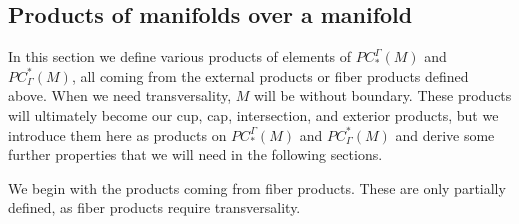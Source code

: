 \subsection{Products of manifolds over a manifold}\label{S: prechain products}

In this section we define various products of elements of $PC_*^\Gamma(M)$ and $PC^*_\Gamma(M)$, all coming from the external products or fiber products defined above.
When we need transversality, $M$ will be without boundary.
These products will ultimately become our cup, cap, intersection, and exterior products, but we introduce them here as products on $PC_*^\Gamma(M)$ and $PC^*_\Gamma(M)$ and derive some further properties that we will need in the following sections.

We begin with the products coming from fiber products.
These are only partially defined, as fiber products require transversality.

